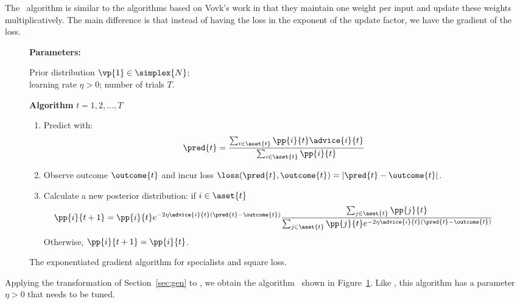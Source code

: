 \iffalse
The \EG\ algorithm maintains a probability vector
$\vp{t}$ and in the
simplest case predicts
linearly, i.e., $\pred{t}=\vp{t}\cdot \advicevec{t}$.
For the case of linear prediction the natural
loss function is the square loss
$\loss(\pred{},\outcome{}) = (\pred{} - \outcome{})^2$.
\fi

The \EG\ algorithm is similar to the algorithms based on Vovk's work
in that they maintain one weight per input and update these weights
multiplicatively. The main difference is that instead of having the
loss in the exponent of the update factor, we have the gradient of the
loss.


\begin{figure}[t]
\normalsize
{\bf Parameters:}
\begin{minipage}[t]{\parmwidth}
Prior distribution $\vp{1}\in \simplex{N}$; \\
learning rate $\eta>0$;
number of trials $T$.
\end{minipage} \newline

{\bf Algorithm \SEG} \newline
{} $t=1,2,\ldots,T$
\begin{enumerate}
 \item Predict with:
  $$
	\pred{t} = { \sum_{i \in \aset{t}} \pp{i}{t} \advice{i}{t} 
                     \over 
                     \sum_{i \in \aset{t}} \pp{i}{t} }
  $$
 \item Observe outcome $\outcome{t}$ and 
       incur loss $\loss(\pred{t},\outcome{t})=|\pred{t} - \outcome{t}|$.
 \item Calculate a new posterior distribution:
if $i \in \aset{t}$
\[
	\pp{i}{t+1} = \pp{i}{t} e^{-2 \eta \advice{i}{t}(\pred{t}-\outcome{t})}
	{\sum_{j \in \aset{t}}
          \pp{j}{t}
         \over
         \sum_{j \in \aset{t}}
          \pp{j}{t} e^{-2 \eta \advice{i}{t}(\pred{t}-\outcome{t})}
        }
\]
Otherwise, $\pp{i}{t+1} =\pp{i}{t}$.
\end{enumerate}

\figline
\caption{The exponentiated gradient algorithm for specialists and 
square loss.\label{fig:SEG}}
\end{figure}

Applying the transformation of Section~\ref{sec:gen} to \EG, we obtain
the algorithm \SEG\ shown in Figure~\ref{fig:SEG}.
Like \SAbs, this algorithm has a parameter $\eta>0$ that needs to be
tuned.

